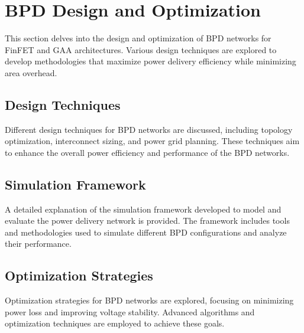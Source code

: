 \section{BPD Design and Optimization}
This section delves into the design and optimization of BPD networks for FinFET and GAA architectures. Various design techniques are explored to develop methodologies that maximize power delivery efficiency while minimizing area overhead.

\subsection{Design Techniques}
Different design techniques for BPD networks are discussed, including topology optimization, interconnect sizing, and power grid planning. These techniques aim to enhance the overall power efficiency and performance of the BPD networks.

\subsection{Simulation Framework}
A detailed explanation of the simulation framework developed to model and evaluate the power delivery network is provided. The framework includes tools and methodologies used to simulate different BPD configurations and analyze their performance.

\subsection{Optimization Strategies}
Optimization strategies for BPD networks are explored, focusing on minimizing power loss and improving voltage stability. Advanced algorithms and optimization techniques are employed to achieve these goals.
